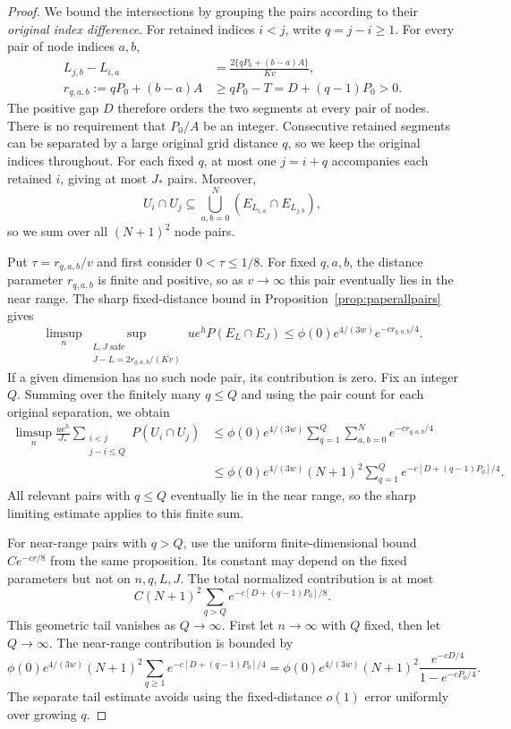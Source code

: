 \documentclass[a4paper,11pt]{article}
\theoremstyle{remark}
\begin{document}
\begin{proof}
We bound the intersections by grouping the pairs according to their
\emph{original index difference}. For retained indices \(i<j\), write
\(q=j-i\ge1\). For every pair of node indices \(a,b\),
\begin{align*}
 L_{j,b}-L_{i,a}
 &=\frac{2\{qP_0+(b-a)A\}}{Kv},\\
 r_{q,a,b}:=qP_0+(b-a)A
 &\ge qP_0-T=D+(q-1)P_0>0.
\end{align*}
The positive gap \(D\) therefore orders the two segments at every pair of nodes.
There is no requirement that \(P_0/A\) be an integer. Consecutive retained
segments can be separated by a large original grid distance \(q\), so we keep
the original indices throughout. For each fixed \(q\), at most one
\(j=i+q\) accompanies each retained \(i\), giving at most \(J_*\) pairs.
Moreover,
\[
 U_i\cap U_j\subseteq
 \bigcup_{a,b=0}^N(E_{L_{i,a}}\cap E_{L_{j,b}}),
\]
so we sum over all \((N+1)^2\) node pairs.

Put \(\tau=r_{q,a,b}/v\) and first consider \(0<\tau\le1/8\).
For fixed \(q,a,b\), the distance parameter \(r_{q,a,b}\) is finite and
positive, so as \(v\to\infty\) this pair eventually lies in the near range.
The sharp fixed-distance bound in Proposition~\ref{prop:paperallpairs} gives
\[
 \limsup_n\sup_{
 \substack{L,J\text{ safe}\\J-L=2r_{q,a,b}/(Kv)}}
 ue^hP(E_L\cap E_J)
 \le\phi(0)e^{4/(3w)}e^{-cr_{q,a,b}/4}.
\]
If a given dimension has no such node pair, its contribution is zero.
Fix an integer \(Q\). Summing over the finitely many \(q\le Q\) and using
the pair count for each original separation, we obtain
\begin{align*}
 \limsup_n\frac{ue^h}{J_*}
 \sum_{\substack{i<j\\j-i\le Q}}P(U_i\cap U_j)
 &\le\phi(0)e^{4/(3w)}
 \sum_{q=1}^Q\sum_{a,b=0}^Ne^{-cr_{q,a,b}/4}\\
 &\le\phi(0)e^{4/(3w)}(N+1)^2
 \sum_{q=1}^Qe^{-c[D+(q-1)P_0]/4}.
\end{align*}
All relevant pairs with \(q\le Q\) eventually lie in the near range, so the
sharp limiting estimate applies to this finite sum.

For near-range pairs with \(q>Q\), use the uniform finite-dimensional bound
\(Ce^{-cr/8}\) from the same proposition. Its constant may depend on the
fixed parameters but not on \(n,q,L,J\). The total normalized contribution
is at most
\[
 C(N+1)^2\sum_{q>Q}e^{-c[D+(q-1)P_0]/8}.
\]
This geometric tail vanishes as \(Q\to\infty\). First let \(n\to\infty\) with
\(Q\) fixed, then let \(Q\to\infty\). The near-range contribution is bounded by
\[
 \phi(0)e^{4/(3w)}(N+1)^2
 \sum_{q\ge1}e^{-c[D+(q-1)P_0]/4}
 =\phi(0)e^{4/(3w)}(N+1)^2
 \frac{e^{-cD/4}}{1-e^{-cP_0/4}}.
\]
The separate tail estimate avoids using the fixed-distance \(o(1)\) error
uniformly over growing \(q\).


\end{proof}
\end{document}
